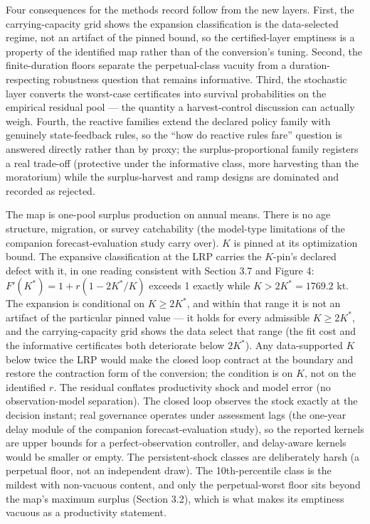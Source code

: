\documentclass[11pt]{article}
\begin{document}
Four consequences for the methods record follow from the new layers.
First, the carrying-capacity grid shows the expansion classification is
the data-selected regime, not an artifact of the pinned bound, so the
certified-layer emptiness is a property of the identified map rather
than of the conversion's tuning. Second, the finite-duration floors
separate the perpetual-class vacuity from a duration-respecting
robustness question that remains informative. Third, the stochastic
layer converts the worst-case certificates into survival probabilities
on the empirical residual pool --- the quantity a harvest-control
discussion can actually weigh. Fourth, the reactive families extend the
declared policy family with genuinely state-feedback rules, so the ``how
do reactive rules fare'' question is answered directly rather than by
proxy; the surplus-proportional family registers a real trade-off
(protective under the informative class, more harvesting than the
moratorium) while the surplus-harvest and ramp designs are dominated and
recorded as rejected.

The map is one-pool surplus production on annual means. There is no age
structure, migration, or survey catchability (the model-type limitations
of the companion forecast-evaluation study carry over). \(K\) is pinned
at its optimization bound. The expansive classification at the LRP
carries the \(K\)-pin's declared defect with it, in one reading
consistent with Section 3.7 and Figure 4:
\(F'(K^*) = 1 + r(1 - 2K^*/K)\) exceeds 1 exactly while
\(K > 2K^* = 1769.2\) kt. The expansion is conditional on
\(K \ge 2K^*\), and within that range it is not an artifact of the
particular pinned value --- it holds for every admissible
\(K \ge 2K^*\), and the carrying-capacity grid shows the data select
that range (the fit cost and the informative certificates both
deteriorate below \(2K^*\)). Any data-supported \(K\) below twice the
LRP would make the closed loop contract at the boundary and restore the
contraction form of the conversion; the condition is on \(K\), not on
the identified \(r\). The residual conflates productivity shock and
model error (no observation-model separation). The closed loop observes
the stock exactly at the decision instant; real governance operates
under assessment lags (the one-year delay module of the companion
forecast-evaluation study), so the reported kernels are upper bounds for
a perfect-observation controller, and delay-aware kernels would be
smaller or empty. The persistent-shock classes are deliberately harsh (a
perpetual floor, not an independent draw). The 10th-percentile class is
the mildest with non-vacuous content, and only the perpetual-worst floor
sits beyond the map's maximum surplus (Section 3.2), which is what makes
its emptiness vacuous as a productivity statement.
\end{document}
